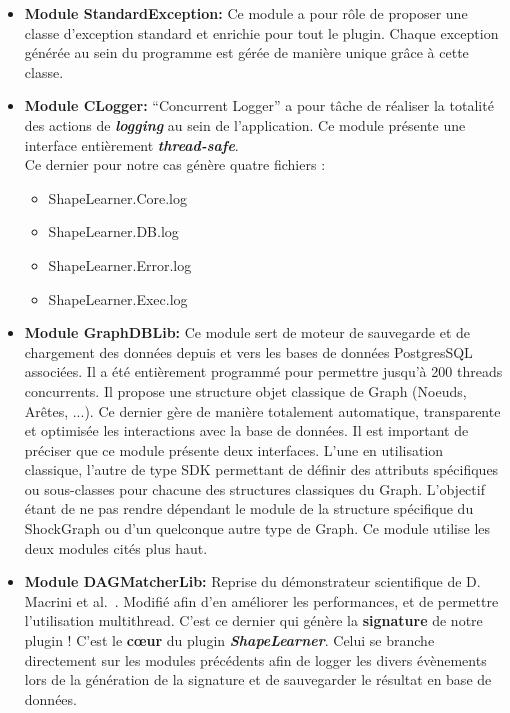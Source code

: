 \begin{itemize}	
	\item \textbf{Module StandardException: } Ce module a pour rôle de proposer une classe d'exception standard et enrichie pour tout le plugin. Chaque exception générée au sein du programme est gérée de manière unique grâce à cette classe.\\

	\item \textbf{Module CLogger: }``Concurrent Logger'' a pour tâche de réaliser la totalité des actions de \textbf{\textit{logging}} au sein de l'application. Ce module présente une interface entièrement \textbf{\textit{thread-safe}}.\\
	Ce dernier pour notre cas génère quatre fichiers :
	\begin{itemize}
		\item ShapeLearner.Core.log
		\item ShapeLearner.DB.log
		\item ShapeLearner.Error.log
		\item ShapeLearner.Exec.log
	\end{itemize}
	\vspace{3mm}
	
	 \item \textbf{Module GraphDBLib: }Ce module sert de moteur de sauvegarde et de chargement des données depuis et vers les bases de données PostgresSQL associées. Il a été entièrement programmé pour permettre jusqu'à 200 threads concurrents. Il propose une structure objet classique de Graph (Noeuds, Arêtes, ...). Ce dernier gère de manière totalement automatique, transparente et optimisée les interactions avec la base de données. Il est important de préciser que ce module présente deux interfaces. L'une en utilisation classique, l'autre de type SDK permettant de définir des attributs spécifiques ou sous-classes pour chacune des structures classiques du Graph. L'objectif étant de ne pas rendre dépendant le module de la structure spécifique du ShockGraph ou d'un quelconque autre type de Graph. Ce module utilise les deux modules cités plus haut.\\
	 
	 \item \textbf{Module DAGMatcherLib: } Reprise du démonstrateur scientifique de D. Macrini et al.~\cite{Macrini2002}. Modifié afin d'en améliorer les performances, et de permettre l'utilisation multithread. C'est ce dernier qui génère la \textbf{signature} de notre plugin ! C'est le \textbf{cœur} du plugin \textbf{\textit{ShapeLearner}}. Celui se branche directement sur les modules précédents afin de logger les divers évènements lors de la génération de la signature et de sauvegarder le résultat en base de données.\\
	 

\end{itemize}
